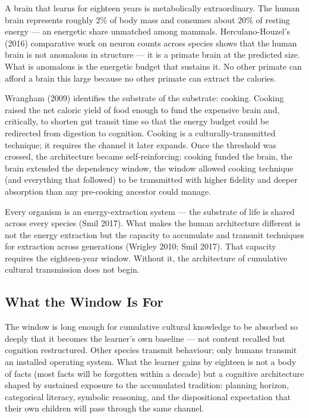 \documentclass[12pt,letterpaper]{article}
\begin{document}
A brain that learns for eighteen years is metabolically extraordinary.
The human brain represents roughly 2\% of body mass and consumes
about 20\% of resting energy --- an energetic share unmatched among
mammals. Herculano-Houzel's (2016) comparative work on neuron counts
across species shows that the human brain is not anomalous in
structure --- it is a primate brain at the predicted size. What is
anomalous is the energetic budget that sustains it. No other primate
can afford a brain this large because no other primate can extract
the calories.

Wrangham (2009) identifies the substrate of the substrate: cooking.
Cooking raised the net caloric yield of food enough to fund the
expensive brain and, critically, to shorten gut transit time so that
the energy budget could be redirected from digestion to cognition.
Cooking is a culturally-transmitted technique; it requires the
channel it later expands. Once the threshold was crossed, the
architecture became self-reinforcing: cooking funded the brain, the
brain extended the dependency window, the window allowed cooking
technique (and everything that followed) to be transmitted with
higher fidelity and deeper absorption than any pre-cooking ancestor
could manage.

Every organism is an energy-extraction system --- the substrate of
life is shared across every species (Smil 2017). What makes the
human architecture different is not the energy extraction but the
capacity to accumulate and transmit techniques for extraction across
generations (Wrigley 2010; Smil 2017). That capacity requires the
eighteen-year window. Without it, the architecture of cumulative
cultural transmission does not begin.

\subsection{What the Window Is For}\label{what-the-window-is-for}

The window is long enough for cumulative cultural knowledge to be
absorbed so deeply that it becomes the learner's own baseline ---
not content recalled but cognition restructured. Other species
transmit behaviour; only humans transmit an installed operating
system. What the learner gains by eighteen is not a body of facts
(most facts will be forgotten within a decade) but a cognitive
architecture shaped by sustained exposure to the accumulated
tradition: planning horizon, categorical literacy, symbolic reasoning,
and the dispositional expectation that their own children will pass
through the same channel.
\end{document}
